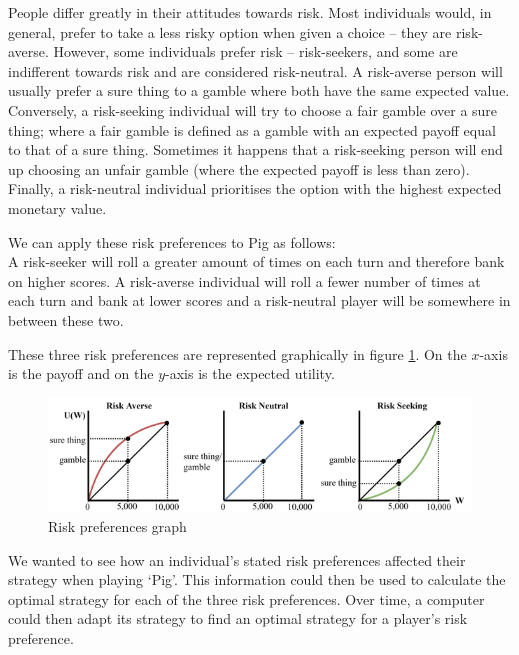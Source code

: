 \documentclass[a4paper,titlepage]{article}
\begin{document}
People differ greatly in their attitudes towards risk. Most individuals would, in general, prefer to take a less risky option when given a choice – they are risk-averse. However, some individuals prefer risk – risk-seekers, and some are indifferent towards risk and are considered risk-neutral. A risk-averse person will usually prefer a sure thing to a gamble where both have the same expected value. Conversely, a risk-seeking individual will try to choose a fair gamble over a sure thing; where a fair gamble is defined as a gamble with an expected payoff equal to that of a sure thing. Sometimes it happens that a risk-seeking person will end up choosing an unfair gamble (where the expected payoff is less than zero). Finally, a risk-neutral individual prioritises the option with the highest expected monetary value.

We can apply these risk preferences to Pig as follows:\\A risk-seeker will roll a greater amount of times on each turn and therefore bank on higher scores. A risk-averse individual will roll a fewer number of times at each turn and bank at lower scores and a risk-neutral player will be somewhere in between these two.

These three risk preferences are represented graphically in figure \ref{figure4}. On the $x$-axis is the payoff and on the $y$-axis is the expected utility.

\begin{figure}
\includegraphics[width=\textwidth]{lottery-a-5}
\caption{Risk preferences graph\label{figure4}}
\end{figure}
We wanted to see how an individual’s stated risk preferences affected their strategy when playing ‘Pig’. This information could then be used to calculate the optimal strategy for each of the three risk preferences. Over time, a computer could then adapt its strategy to find an optimal strategy for a player’s risk preference.
\end{document}
